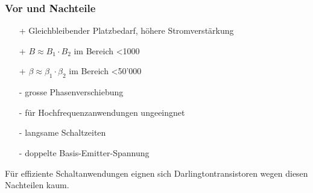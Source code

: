 \subsubsection{Vor und Nachteile}
\vspace{-0.5cm}
\begin{multicols}{2}
    \begin{minipage}{\linewidth}
        \begin{itemize}
            \item [+] Gleichbleibender Platzbedarf, höhere Stromverstärkung
            \item [+] $ B \approx B_1 \cdot B_2 $ im Bereich <1000 
            \item [+] $ \beta \approx \beta_1 \cdot \beta_2 $ im Bereich <50'000
        \end{itemize}
    \end{minipage}
    
    \begin{minipage}{1.2\linewidth}
        \begin{itemize}
            \item [-] grosse Phasenverschiebung
            \item [-] für Hochfrequenzanwendungen ungeeingnet
            \item [-] langsame Schaltzeiten
            \item [-] doppelte Basis-Emitter-Spannung
        \end{itemize}
    \end{minipage}
\end{multicols}
Für effiziente Schaltanwendungen eignen sich Darlingtontransistoren wegen diesen Nachteilen kaum.
 \vspace{-0.2cm}

